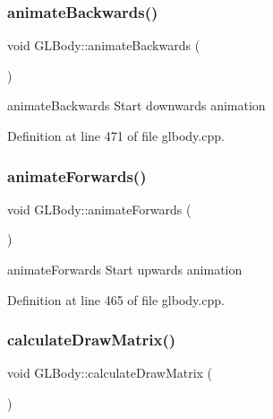 \subsubsection{\texorpdfstring{animateBackwards()}{animateBackwards()}}
{\footnotesize\ttfamily void G\+L\+Body\+::animate\+Backwards (\begin{DoxyParamCaption}{ }\end{DoxyParamCaption})\hspace{0.3cm}{\ttfamily [virtual]}}



animate\+Backwards Start downwards animation 



Definition at line 471 of file glbody.\+cpp.

\mbox{\label{class_g_l_body_aebb22dadd619ce98ca7c72d3970e65c9}} 
\subsubsection{\texorpdfstring{animateForwards()}{animateForwards()}}
{\footnotesize\ttfamily void G\+L\+Body\+::animate\+Forwards (\begin{DoxyParamCaption}{ }\end{DoxyParamCaption})\hspace{0.3cm}{\ttfamily [virtual]}}



animate\+Forwards Start upwards animation 



Definition at line 465 of file glbody.\+cpp.

\mbox{\label{class_g_l_body_af69c1be811d9da78c2cf9d65deb83b5d}} 
\subsubsection{\texorpdfstring{calculateDrawMatrix()}{calculateDrawMatrix()}}
{\footnotesize\ttfamily void G\+L\+Body\+::calculate\+Draw\+Matrix (\begin{DoxyParamCaption}{ }\end{DoxyParamCaption})\hspace{0.3cm}{\ttfamily [virtual]}}



